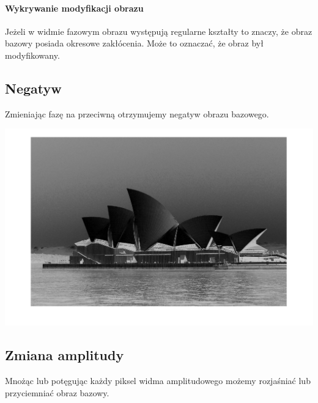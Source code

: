 \documentclass{article}
\begin{document}
	\paragraph{Wykrywanie modyfikacji obrazu}
	Jeżeli w widmie fazowym obrazu występują regularne kształty to znaczy, że obraz bazowy posiada okresowe zakłócenia.
	Może to oznaczać, że obraz był modyfikowany.
	\subsection{Negatyw}
	Zmieniając fazę na przeciwną otrzymujemy negatyw obrazu bazowego.
	\begin{center}
		\includegraphics[width=\linewidth]{../../lab04/negative.png}
	\end{center}
	
	
	\subsection{Zmiana amplitudy}
	Mnożąc lub potęgując każdy piksel widma amplitudowego możemy rozjaśniać lub przyciemniać obraz bazowy.
	
	
\end{document}
